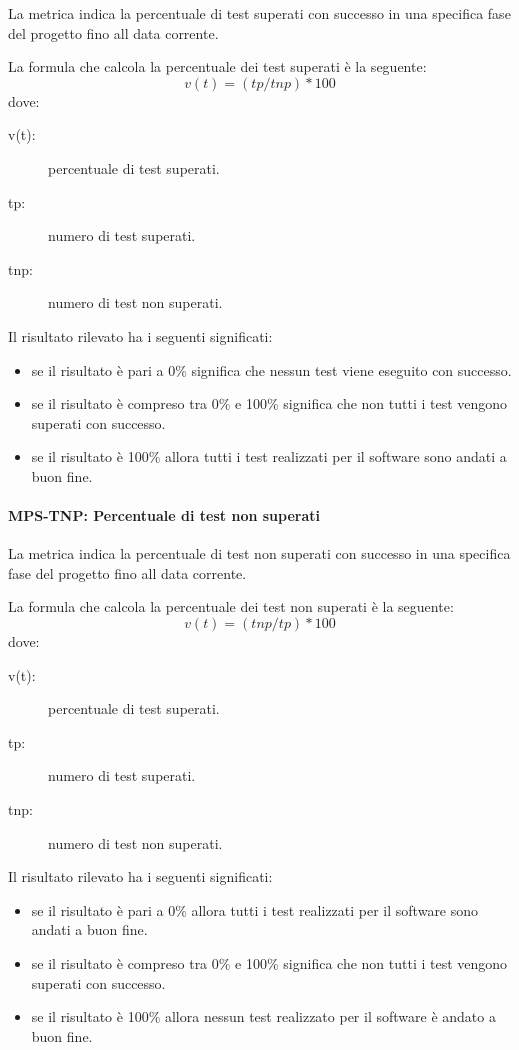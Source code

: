 \documentclass[../../norme-di-progetto.tex]{subfiles}
\begin{document}
La metrica indica la percentuale di test superati con successo in una specifica fase del progetto fino all data corrente.

La formula che calcola la percentuale dei test superati è la seguente:
\[
 v(t) = (tp / tnp) * 100
\]
dove:
\begin{description}
 \item[v(t):] percentuale di test superati. %
 \item[tp:] numero di test superati.
 \item[tnp:] numero di test non superati.

\end{description}

Il risultato rilevato ha i seguenti significati:
\begin{itemize}
  \item se il risultato è pari a 0\% significa che nessun test viene eseguito con successo.
  \item se il risultato è compreso tra 0\% e 100\% significa che non tutti i test vengono superati con successo.
  \item se il risultato è 100\% allora tutti i test realizzati per il software sono andati a buon fine.
\end{itemize}




\paragraph{MPS-TNP: Percentuale di test non superati}%
\label{par:MPS-TNP_test_non_passati}

La metrica indica la percentuale di test non superati con successo in una specifica fase del progetto fino all data corrente.

La formula che calcola la percentuale dei test non superati è la seguente:
\[
 v(t) = (tnp / tp) * 100
\]
dove:
\begin{description}
 \item[v(t):] percentuale di test superati. %
 \item[tp:] numero di test superati.
 \item[tnp:] numero di test non superati.

\end{description}

Il risultato rilevato ha i seguenti significati:
\begin{itemize}
  \item se il risultato è pari a 0\% allora tutti i test realizzati per il software sono andati a buon fine.
  \item se il risultato è compreso tra 0\% e 100\% significa che non tutti i test vengono superati con successo.
  \item se il risultato è 100\% allora nessun test realizzato per il software è andato a buon fine.
\end{itemize}
\end{document}
